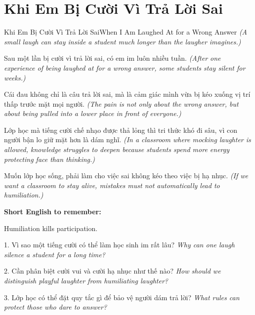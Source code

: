\section{Khi Em Bị Cười Vì Trả Lời Sai}
\begin{truyen}{Khi Em Bị Cười Vì Trả Lời Sai}{When I Am Laughed At for a Wrong Answer}
\textit{(A small laugh can stay inside a student much longer than the laugher imagines.)}

Sau một lần bị cười vì trả lời sai, có em im luôn nhiều tuần.
\textit{(After one experience of being laughed at for a wrong answer, some students stay silent for weeks.)}

Cái đau không chỉ là câu trả lời sai, mà là cảm giác mình vừa bị kéo xuống vị trí thấp trước mặt mọi người.
\textit{(The pain is not only about the wrong answer, but about being pulled into a lower place in front of everyone.)}

Lớp học mà tiếng cười chế nhạo được thả lỏng thì tri thức khó đi sâu, vì con người bận lo giữ mặt hơn là dám nghĩ.
\textit{(In a classroom where mocking laughter is allowed, knowledge struggles to deepen because students spend more energy protecting face than thinking.)}
\end{truyen}

\begin{baihoc}
Muốn lớp học sống, phải làm cho việc sai không kéo theo việc bị hạ nhục.
\textit{(If we want a classroom to stay alive, mistakes must not automatically lead to humiliation.)}
\end{baihoc}

\begin{ghinhoanh}
\textbf{Short English to remember:}

Humiliation kills participation.

\end{ghinhoanh}

\begin{tuhocnhanh}
1. Vì sao một tiếng cười có thể làm học sinh im rất lâu? \textit{Why can one laugh silence a student for a long time?}

2. Cần phân biệt cười vui và cười hạ nhục như thế nào? \textit{How should we distinguish playful laughter from humiliating laughter?}

3. Lớp học có thể đặt quy tắc gì để bảo vệ người dám trả lời? \textit{What rules can protect those who dare to answer?}
\end{tuhocnhanh}
\ngancach

